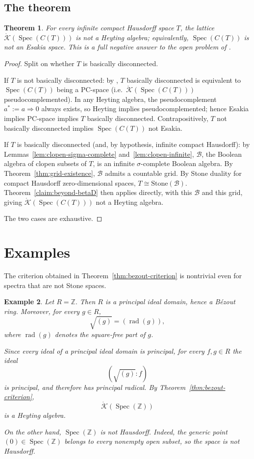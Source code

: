 \documentclass{amsart}
\newtheorem{theorem}{Theorem}
\newtheorem{example}[theorem]{Example}
\theoremstyle{definition}
\theoremstyle{remark}
\newcommand{\Spec}[1]{\operatorname{Spec}\left(#1\right)}
\newcommand{\integers}{\mathbb Z}
\newcommand{\cont}[1]{C\left(#1\right)}
\newcommand{\KOp}[1]{\mathring{\mathcal{K}}\left(#1\right)}
\begin{document}
\subsection{The theorem}

\begin{theorem}\label{thm:full-negative}
For every infinite compact Hausdorff space $T$, the lattice
$\KOp{\Spec{\cont{T}}}$ is not a Heyting algebra; equivalently,
$\Spec{\cont{T}}$ is not an Esakia space. This is a full negative
answer to the open problem of \cite{bezhanishvili-tressl-2026}.
\end{theorem}

\begin{proof}
Split on whether $T$ is basically disconnected.

If $T$ is not basically disconnected: by
\cite[Thm.~5.6]{bezhanishvili-tressl-2026}, $T$ basically disconnected is
equivalent to $\Spec{\cont{T}}$ being a PC-space (i.e.\
$\KOp{\Spec{\cont{T}}}$ pseudocomplemented). In any Heyting
algebra, the pseudocomplement $a^\ast:=a\Rightarrow0$ always exists, so
Heyting implies pseudocomplemented; hence Esakia implies PC-space
implies $T$ basically disconnected. Contrapositively, $T$ not basically
disconnected implies $\Spec{\cont{T}}$ not Esakia.

If $T$ is basically disconnected (and, by hypothesis, infinite compact
Hausdorff): by Lemmas~\ref{lem:clopen-sigma-complete}
and~\ref{lem:clopen-infinite}, $\mathcal B$, the Boolean algebra of
clopen subsets of $T$, is an infinite $\sigma$-complete Boolean algebra.
By Theorem~\ref{thm:grid-existence}, $\mathcal B$ admits a countable
grid. By Stone duality for compact Hausdorff zero-dimensional spaces,
$T\cong\mathrm{Stone}(\mathcal B)$. Theorem~\ref{claim:beyond-betaD} then
applies directly, with this $\mathcal B$ and this grid, giving
$\KOp{\Spec{\cont{T}}}$ not a Heyting algebra.

The two cases are exhaustive.
\end{proof}

\section{Examples}

The criterion obtained in Theorem~\ref{thm:bezout-criterion} is nontrivial even for spectra that are not
Stone spaces.

\begin{example}
Let
$
R=\integers.
$
Then \(R\) is a principal ideal domain, hence a B\'ezout ring.
Moreover, for every \(g\in R\),
\[
\sqrt{(g)}=(\operatorname{rad}(g)),
\]
where \(\operatorname{rad}(g)\) denotes the square-free part of \(g\).

Since every ideal of a principal ideal domain is principal, for every
\(f,g\in R\) the ideal
\[
(\sqrt{(g)}:f)
\]
is principal, and therefore has principal radical.
By Theorem~\ref{thm:bezout-criterion},
\[
\KOp{\Spec{\integers}}
\]
is a Heyting algebra.

On the other hand,
$
\Spec{\integers}
$
is not Hausdorff. Indeed, the generic point
$
(0)\in\Spec{\integers}
$
belongs to every nonempty open subset, so the space is not Hausdorff.
\end{example}

\printbibliography
\end{document}
